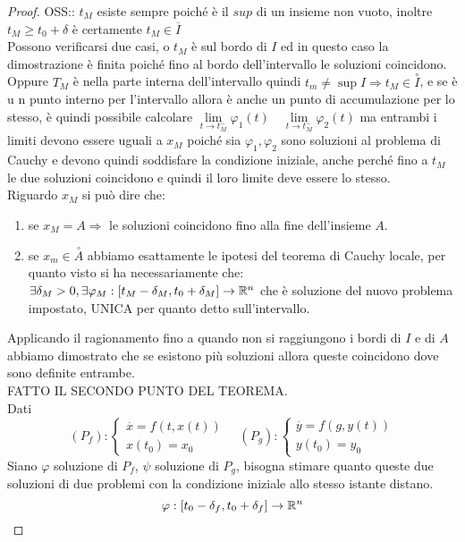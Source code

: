 \begin{proof}
	OSS:: $t_M$ esiste sempre poiché è il $sup$ di un insieme non vuoto, inoltre $t_M\ge t_0+\delta$ è certamente $t_M\in \overline{I}$\\
	Possono verificarsi due casi, o $t_M$ è sul bordo di $I$ ed in questo caso la dimostrazione è finita poiché fino al bordo dell'intervallo le soluzioni coincidono.
	Oppure $T_M$ è nella parte interna dell'intervallo quindi $t_m\ne\sup I\Rightarrow t_M\in\overset{\circ}{I}$, e se è u n punto interno per l'intervallo allora è anche un punto di accumulazione per lo stesso, è quindi possibile calcolare $\lim\limits_{t\to t_M^{-}}\varphi_1(t)\quad\lim\limits_{t\to t_M^{-}}\varphi_2(t)$ ma entrambi i limiti devono essere uguali a $x_M$ poiché sia $\varphi_1,\varphi_2$ sono soluzioni al problema  di Cauchy e devono quindi soddisfare la condizione iniziale, anche perché fino a $t_M$ le due soluzioni coincidono e quindi il loro limite deve essere lo stesso.\\
	Riguardo $x_M$ si può dire che:
	\begin{enumerate}
		\item se $x_M = A\Rightarrow$ le soluzioni coincidono fino alla fine dell'insieme $A$.
		\item se $x_m\in\overset{\circ}{A}$ abbiamo esattamente le ipotesi del teorema di Cauchy locale, per quanto visto si ha necessariamente che:\\
		$\exists \delta_M>0,\exists \varphi_M:\left[t_M-\delta_M,t_0+\delta_M\right]\to \mathbb{R}^n$ che è soluzione del nuovo problema impostato, UNICA per quanto detto sull'intervallo.
	\end{enumerate} 
	Applicando il ragionamento fino a quando non si raggiungono i bordi di $I$ e di $A$ abbiamo dimostrato che se esistono più soluzioni allora queste coincidono dove sono definite entrambe.\\
	FATTO IL SECONDO PUNTO DEL TEOREMA.\\
	Dati
	$$(P_f):\left\{\begin{matrix}\overset{\cdot}{x}=f(t,x(t))\\x(t_0)=x_{0}\end{matrix}\right.\quad	(P_g):\left\{\begin{matrix}\overset{\cdot}{y}=f(g,y(t))\\y(t_0)=y_{0}\end{matrix}\right.$$
	Siano $\varphi$ soluzione di $P_f$, $\psi$ soluzione di $P_g$, bisogna stimare quanto queste due soluzioni di due problemi con la condizione iniziale allo stesso istante distano.
	$$\varphi:\left[t_0-\delta_f,t_0+\delta_f\right]\to \mathbb{R}^n$$

\end{proof}
